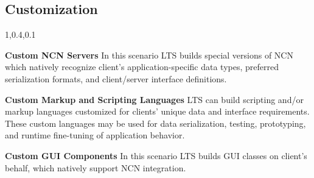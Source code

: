 
\begin{frame}{}
\section{Customization}
\vspace{-1em}	

{\Large{}\selectfont
\hspace*{-20pt}\begin{minipage}{1.08\textwidth}
\vspace{-4pt}


		
\begin{lightquadblockc}{1,0.4,0.1}{\parbox{24cm}{\centering \vspace{13pt}\color[rgb]{0,0,0}{This slide will identify how LTS may customize NA3 components for 
individual clients} \color[rgb]{0.3,0,0.1}{(dollar figures 
project average custom development 
and licensing fees)}\vspace{18pt}}}
\hspace{-4pt}\begin{minipage}{1.07\textwidth}
{\LARGE \setlength{\leftmargini}{30pt}\begin{enumerate}
\dmitem \textbf{Custom NCN Servers} \hspace{.5em} 
In this scenario LTS builds special versions of 
NCN which natively recognize client's application-specific 
data types, preferred serialization formats, 
and client/server interface definitions. 
{\color[rgb]{0.3,0,0.1}{(dev: \$75K; licensing: \$10K/month)}}\vspace{18pt}

\dmitem \textbf{Custom Markup and Scripting Languages}  \hspace{.5em} 
LTS can build scripting and/or markup languages 
customized for clients' unique data and interface 
requirements.  These custom languages may be used 
for data serialization, testing, prototyping, 
and runtime fine-tuning of application behavior.
{\color[rgb]{0.3,0,0.1}{(dev: \$250K; licensing: \$10K/month)}}\vspace{18pt}

\dmitem \textbf{Custom GUI Components}  \hspace{.5em} 
In this scenario LTS builds GUI classes 
on client's behalf, which natively support NCN 
integration. 
{\color[rgb]{0.3,0,0.1}{(dev: \$50K; licensing: \$5K/month)}}\vspace{18pt}


\end{enumerate}}
\end{minipage}
\end{lightquadblockc}
\end{minipage}}
\end{frame}
